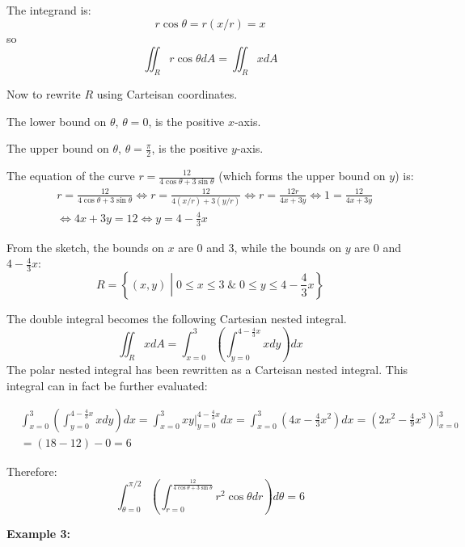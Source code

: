 \documentclass{article}
\begin{document}
The integrand is:
\[r\cos\theta = r(x/r) = x\]
so
\[\iint_R r\cos\theta dA = \iint_R x dA\]

Now to rewrite \(R\) using Carteisan coordinates. 

The lower bound on \(\theta\), \(\theta = 0\), is the positive \(x\)-axis. 

The upper bound on \(\theta\), \(\theta = \frac{\pi}{2}\), is the positive \(y\)-axis. 

The equation of the curve \(r = \frac{12}{4\cos\theta + 3\sin\theta}\) (which forms the upper bound on \(y\)) is: 
\begin{align*}
& r = \frac{12}{4\cos\theta + 3\sin\theta} 
\iff r = \frac{12}{4(x/r) + 3(y/r)}    
\iff r = \frac{12r}{4x + 3y} 
\iff 1 = \frac{12}{4x + 3y} \\
& \iff 4x + 3y = 12 
\iff y = 4 - \frac{4}{3}x
\end{align*}

From the sketch, the bounds on \(x\) are \(0\) and \(3\), while the bounds on \(y\) are \(0\) and \(4 - \frac{4}{3}x\):
\[R = \left\{(x, y)\middle| 0 \leq x \leq 3 \;\&\; 0 \leq y \leq 4 - \frac{4}{3}x\right\}\]

The double integral becomes the following Cartesian nested integral. 
\[\iint_R x dA = \int_{x = 0}^{3} \left(\int_{y = 0}^{4 - \frac{4}{3}x} x dy\right)dx\]
The polar nested integral has been rewritten as a Carteisan nested integral. This integral can in fact be further evaluated:

\begin{align*}
& \int_{x = 0}^{3} \left(\int_{y = 0}^{4 - \frac{4}{3}x} x dy\right)dx 
= \int_{x = 0}^{3} xy\Big|_{y = 0}^{4 - \frac{4}{3}x} dx 
= \int_{x = 0}^{3} (4x - \frac{4}{3}x^2) dx 
= (2x^2 - \frac{4}{9}x^3)\Big|_{x = 0}^{3} \\
& = (18 - 12) - 0 
= 6 
\end{align*}

Therefore:
\[\int_{\theta = 0}^{\pi/2} \left(\int_{r = 0}^{\frac{12}{4\cos\theta + 3\sin\theta}} r^2\cos\theta dr\right)d\theta = 6\]





\vspace{5mm}

\textbf{Example 3:}

\vspace{5mm}
\end{document}
